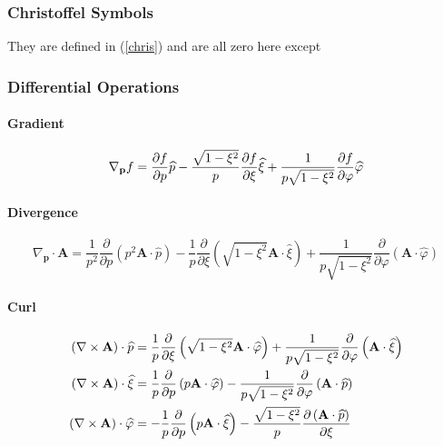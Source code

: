 \subsubsection{Christoffel Symbols}

They are defined in (\ref{chris}) and are all zero here except

\subsubsection{Differential Operations}

\paragraph{Gradient}

\begin{equation}
\nabla_{\mathbf{p}}f=\frac{\partial f}{\partial p}\widehat{p}-\frac {\sqrt{%
1-\xi^{2}}}{p}\frac{\partial f}{\partial\xi}\widehat{\xi}+\frac {1}{p\sqrt{%
1-\xi^{2}}}\frac{\partial f}{\partial\varphi}\widehat{\varphi}
\label{pxigrad}
\end{equation}

\paragraph{Divergence}

\begin{equation}
\nabla_{\mathbf{p}}\cdot\mathbf{A}=\frac{1}{p^{2}}\frac{\partial}{\partial p}
\left( p^{2}\mathbf{A}\cdot\widehat{p}\right) -\frac{1}{p}\frac{\partial}{
\partial\xi}\left( \sqrt{1-\xi^{2}}\mathbf{A}\cdot\widehat{\xi}\right) +%
\frac{1}{p\sqrt{1-\xi^{2}}}\frac{\partial}{\partial\varphi}\left( \mathbf{A}
\cdot\widehat{\varphi}\right)  \label{pxidiv}
\end{equation}

\paragraph{Curl}

\begin{align}
\left( \nabla\times\mathbf{A}\right) \cdot\widehat{p} & =\frac{1}{p}\frac{%
\partial}{\partial\xi}\left( \sqrt{1-\xi^{2}}\mathbf{A}\cdot \widehat{\varphi%
}\right) +\frac{1}{p\sqrt{1-\xi^{2}}}\frac{\partial}{\partial\varphi}\left( 
\mathbf{A}\cdot\widehat{\xi}\right)  \label{pxicurl} \\
\left( \nabla\times\mathbf{A}\right) \cdot\widehat{\xi} & =\frac{1}{p}\frac{%
\partial}{\partial p}\left( p\mathbf{A}\cdot\widehat{\varphi }\right) -\frac{%
1}{p\sqrt{1-\xi^{2}}}\frac{\partial}{\partial\varphi}\left( \mathbf{A}\cdot%
\widehat{p}\right)  \notag \\
\left( \nabla\times\mathbf{A}\right) \cdot\widehat{\varphi} & =-\frac {1}{p}%
\frac{\partial}{\partial p}\left( p\mathbf{A}\cdot\widehat{\xi}\right) -%
\frac{\sqrt{1-\xi^{2}}}{p}\frac{\partial\left( \mathbf{A}\cdot\widehat {p}%
\right) }{\partial\xi}  \notag
\end{align}
